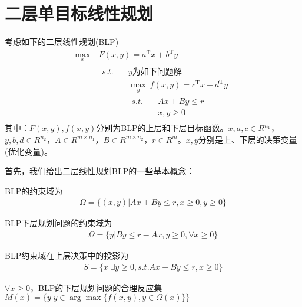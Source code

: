 \section{二层单目标线性规划}
    \par
    考虑如下的二层线性规划(BLP)
    \begin{align*}
       \mathop{\max}\limits_{x}\  & F(x,y)=a^\mathrm{T} x+b^\mathrm{T} y\\
       &\begin{aligned}
       s.t.\quad  & y\text{为如下问题解}\\
       & \mathop{\max}\limits_{y}\  f(x,y)=c^\mathrm{T} x+d^\mathrm{T} y\\
       &
       \begin{aligned}
       s.t.\quad &Ax+By \leqslant r\\
       &x,y \geqslant 0
       \end{aligned}
       \end{aligned}
    \end{align*}
    其中：$F(x,y),f(x,y)$分别为BLP的上层和下层目标函数。$x,a,c\in R^{n_1}$，$y,b,d \in R^{n_2}$，$A\in R^{m\times n_1}$，$B\in R^{m\times n_2}$，$r \in R^m$。$x,y$分别是上、下层的决策变量(优化变量)。
    \par
    首先，我们给出二层线性规划BLP的一些基本概念：
    \begin{definition}
    BLP的约束域为
    \begin{align*}
        \Omega=\{(x,y)|Ax+By \leqslant r,x \geqslant 0,y \geqslant 0\}
    \end{align*}
    \end{definition}
    \begin{definition}
    BLP下层规划问题的约束域为
    \begin{align*}
    \Omega=\{y|By \leqslant r-Ax,y \geqslant 0,\forall x \geqslant 0\}
    \end{align*}
    \end{definition}
    \begin{definition}
    BLP约束域在上层决策中的投影为
    \begin{align*}
        S=\{x|\exists y \geqslant 0,s.t. {}Ax+By\leqslant r,x \geqslant 0\}
    \end{align*}
    \end{definition}
    \begin{definition}
    $\forall x \geqslant 0$，BLP的下层规划问题的合理反应集$M(x)=\{y|y \in \arg\max\{f(x,y),y\in \Omega(x)\}\}$
    \end{definition}
